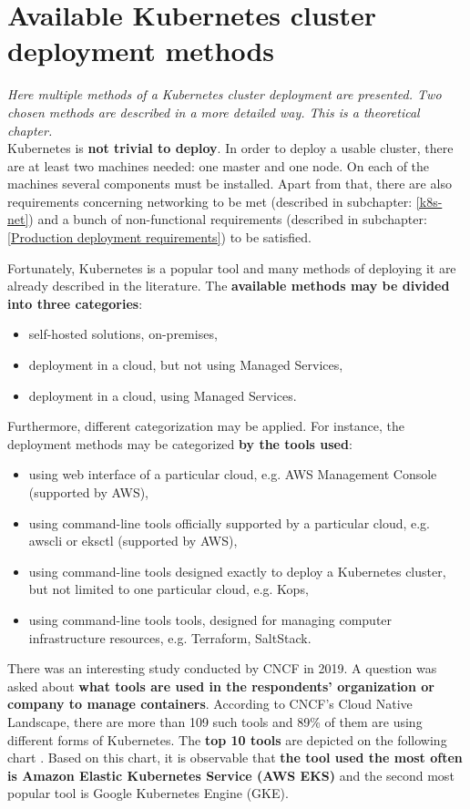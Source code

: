 \section{Available Kubernetes cluster deployment methods}
\label{3-methods}
\textit{Here multiple methods of a Kubernetes cluster deployment are presented. Two chosen methods are described in a more detailed way. This is a theoretical chapter.}
\\

Kubernetes is \textbf{not trivial to deploy}. In order to deploy a usable cluster, there are at least two machines needed: one master and one node. On each of the machines several components must be installed. Apart from that, there are also requirements concerning networking to be met (described in subchapter: \ref{k8s-net}) and a bunch of non-functional requirements (described in subchapter: \ref{Production deployment requirements}) to be satisfied.

Fortunately, Kubernetes is a popular tool and many methods of deploying it are already described in the literature. The \textbf{available methods may be divided into three categories}:
\begin{itemize}
\item self-hosted solutions, on-premises,
\item deployment in a cloud, but not using Managed Services,
\item deployment in a cloud, using Managed Services.
\end{itemize}

Furthermore, different categorization may be applied. For instance, the deployment methods may be categorized \textbf{by the tools used}:
\begin{itemize}
\item using web interface of a particular cloud, e.g. AWS Management Console (supported by AWS),
\item using command-line tools officially supported by a particular cloud, e.g. awscli or eksctl (supported by AWS),
\item using command-line tools designed exactly to deploy a Kubernetes cluster, but not limited to one particular cloud, e.g. Kops,
\item using command-line tools tools, designed for managing computer infrastructure resources, e.g. Terraform, SaltStack.
\end{itemize}

There was an interesting study conducted by CNCF in 2019. A question was asked about \textbf{what tools are used in the respondents' organization or company to manage containers}. According to CNCF's Cloud Native Landscape, there are more than 109 such tools and 89\% of them are using different forms of Kubernetes. The \textbf{top 10 tools} are depicted on the following chart \cite{cncf-2019}. Based on this chart, it is observable that \textbf{the tool used the most often is Amazon Elastic Kubernetes Service (AWS EKS)} and the second most popular tool is Google Kubernetes Engine (GKE).

